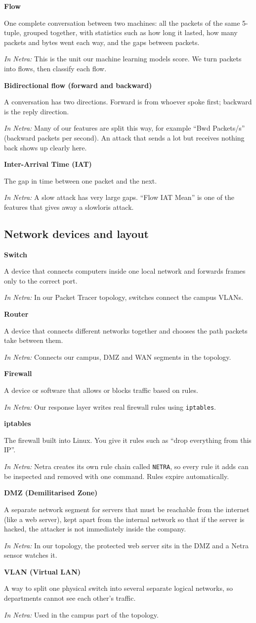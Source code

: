 \documentclass[11pt,a4paper]{article}
\newcommand{\term}[3]{%
  \par\medskip\noindent\textbf{\color{ink}#1}\par
  \nobreak\vspace{1pt}#2\par
  \nobreak\vspace{1pt}\textit{\color{accent}In Netra:} #3\par}
\begin{document}
\term{Flow}
{One complete conversation between two machines: all the packets of the same
5-tuple, grouped together, with statistics such as how long it lasted, how many
packets and bytes went each way, and the gaps between packets.}
{This is the unit our machine learning models score. We turn packets into flows,
then classify each flow.}

\term{Bidirectional flow (forward and backward)}
{A conversation has two directions. Forward is from whoever spoke first;
backward is the reply direction.}
{Many of our features are split this way, for example ``Bwd Packets/s''
(backward packets per second). An attack that sends a lot but receives nothing
back shows up clearly here.}

\term{Inter-Arrival Time (IAT)}
{The gap in time between one packet and the next.}
{A slow attack has very large gaps. ``Flow IAT Mean'' is one of the features that
gives away a slowloris attack.}

\subsection{Network devices and layout}

\term{Switch}
{A device that connects computers inside one local network and forwards frames
only to the correct port.}
{In our Packet Tracer topology, switches connect the campus VLANs.}

\term{Router}
{A device that connects different networks together and chooses the path packets
take between them.}
{Connects our campus, DMZ and WAN segments in the topology.}

\term{Firewall}
{A device or software that allows or blocks traffic based on rules.}
{Our response layer writes real firewall rules using \texttt{iptables}.}

\term{iptables}
{The firewall built into Linux. You give it rules such as ``drop everything from
this IP''.}
{Netra creates its own rule chain called \texttt{NETRA}, so every rule it adds can
be inspected and removed with one command. Rules expire automatically.}

\term{DMZ (Demilitarised Zone)}
{A separate network segment for servers that must be reachable from the internet
(like a web server), kept apart from the internal network so that if the server is
hacked, the attacker is not immediately inside the company.}
{In our topology, the protected web server sits in the DMZ and a Netra sensor
watches it.}

\term{VLAN (Virtual LAN)}
{A way to split one physical switch into several separate logical networks, so
departments cannot see each other's traffic.}
{Used in the campus part of the topology.}
\end{document}
